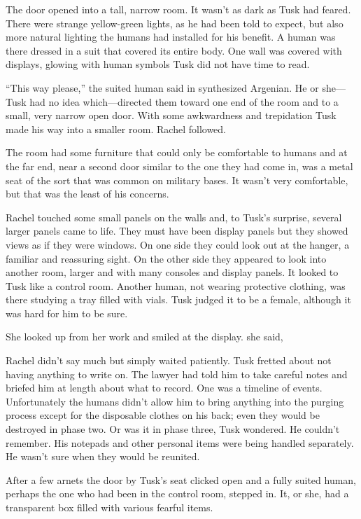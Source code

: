 
The door opened into a tall, narrow room. It wasn't as dark as Tusk had feared. There were
strange yellow-green lights, as he had been told to expect, but also more natural lighting the
humans had installed for his benefit. A human was there dressed in a suit that covered its
entire body. One wall was covered with displays, glowing with human symbols Tusk did not have
time to read.

``This way please,'' the suited human said in synthesized Argenian. He or she---Tusk had no idea
which---directed them toward one end of the room and to a small, very narrow open door. With
some awkwardness and trepidation Tusk made his way into a smaller room. Rachel followed.

The room had some furniture that could only be comfortable to humans and at the far end, near a
second door similar to the one they had come in, was a metal seat of the sort that was common on
military bases. It wasn't very comfortable, but that was the least of his concerns.

Rachel touched some small panels on the walls and, to Tusk's surprise, several larger panels
came to life. They must have been display panels but they showed views as if they were windows.
On one side they could look out at the hanger, a familiar and reassuring sight. On the other
side they appeared to look into another room, larger and with many consoles and display panels.
It looked to Tusk like a control room. Another human, not wearing protective clothing, was there
studying a tray filled with vials. Tusk judged it to be a female, although it was hard for him
to be sure.

She looked up from her work and smiled at the display.  she
said, 

Rachel didn't say much but simply waited patiently. Tusk fretted about not having anything to
write on. The lawyer had told him to take careful notes and briefed him at length about what to
record. One was a timeline of events. Unfortunately the humans didn't allow him to bring
anything into the purging process except for the disposable clothes on his back; even they would
be destroyed in phase two. Or was it in phase three, Tusk wondered. He couldn't remember. His
notepads and other personal items were being handled separately. He wasn't sure when they would
be reunited.

After a few arnets the door by Tusk's seat clicked open and a fully suited human, perhaps the
one who had been in the control room, stepped in. It, or she, had a transparent box filled with
various fearful items.

